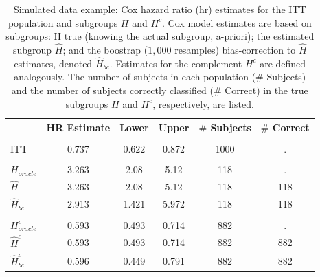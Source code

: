 \documentclass[smallextended]{svjour3}
\begin{document}
\begin{table}

\caption{\label{tab:simex_tab}\label{tab:simex} Simulated data example: Cox hazard ratio (hr) estimates for the ITT population and subgroups $H$ and $H^{c}$.
Cox model estimates are based on subgroups: H true (knowing the actual subgroup, a-priori); the estimated subgroup $\hat{H}$; and 
the boostrap ($1,000$ resamples) bias-correction to $\hat{H}$ estimates, denoted $\hat{H}_{bc}$.  Estimates for the complement $H^{c}$ are defined analogously.
The number of subjects in each population ($\#$ Subjects) and the number of subjects correctly classified ($\#$ Correct) in the true subgroups $H$ and $H^{c}$, respectively, are listed.}
\centering
\fontsize{9}{11}\selectfont
\begin{tabular}[t]{lccccc}
\toprule
  & HR Estimate & Lower & Upper & $\#$ Subjects & $\#$ Correct\\
\midrule
\addlinespace[0.3em]
\multicolumn{6}{l}{\textbf{ITT}}\\
\hspace{1em}ITT & 0.737 & 0.622 & 0.872 & 1000 & .\\
\addlinespace[0.3em]
\multicolumn{6}{l}{\textbf{H subgroup estimates}}\\
\hspace{1em}$H_{oracle}$ & 3.263 & 2.08 & 5.12 & 118 & .\\
\hspace{1em}$\hat{H}$ & 3.263 & 2.08 & 5.12 & 118 & 118\\
\hspace{1em}$\hat{H}_{bc}$ & 2.913 & 1.421 & 5.972 & 118 & 118\\
\addlinespace[0.3em]
\multicolumn{6}{l}{\textbf{H-complement subgroup estimates}}\\
\hspace{1em}$H^{c}_{oracle}$ & 0.593 & 0.493 & 0.714 & 882 & .\\
\hspace{1em}$\hat{H}^{c}$ & 0.593 & 0.493 & 0.714 & 882 & 882\\
\hspace{1em}$\hat{H}^{c}_{bc}$ & 0.596 & 0.449 & 0.791 & 882 & 882\\
\bottomrule
\end{tabular}
\end{table}





\end{document}
